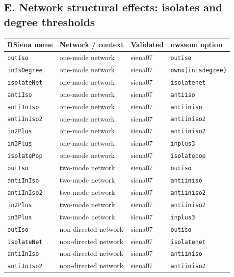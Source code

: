 \subsection*{E. Network structural effects: isolates and degree thresholds}
\footnotesize
\begin{longtable}{@{}p{2.6cm}p{3.2cm}p{2.9cm}p{5.4cm}@{}}
\toprule
RSiena name & Network / context & Validated & nwsaom option\\
\midrule
\endhead
\texttt{outIso} & one-mode network & siena07 & \texttt{outiso}\\
\texttt{inIsDegree} & one-mode network & siena07 & \texttt{ownx(inisdegree)}\\
\texttt{isolateNet} & one-mode network & siena07 & \texttt{isolatenet}\\
\texttt{antiIso} & one-mode network & siena07 & \texttt{antiiso}\\
\texttt{antiInIso} & one-mode network & siena07 & \texttt{antiiniso}\\
\texttt{antiInIso2} & one-mode network & siena07 & \texttt{antiiniso2}\\
\texttt{in2Plus} & one-mode network & siena07 & \texttt{antiiniso2}\\
\texttt{in3Plus} & one-mode network & siena07 & \texttt{inplus3}\\
\texttt{isolatePop} & one-mode network & siena07 & \texttt{isolatepop}\\
\texttt{outIso} & two-mode network & siena07 & \texttt{outiso}\\
\texttt{antiInIso} & two-mode network & siena07 & \texttt{antiiniso}\\
\texttt{antiInIso2} & two-mode network & siena07 & \texttt{antiiniso2}\\
\texttt{in2Plus} & two-mode network & siena07 & \texttt{antiiniso2}\\
\texttt{in3Plus} & two-mode network & siena07 & \texttt{inplus3}\\
\texttt{outIso} & non-directed network & siena07 & \texttt{outiso}\\
\texttt{isolateNet} & non-directed network & siena07 & \texttt{isolatenet}\\
\texttt{antiInIso} & non-directed network & siena07 & \texttt{antiiniso}\\
\texttt{antiInIso2} & non-directed network & siena07 & \texttt{antiiniso2}\\
\bottomrule
\end{longtable}
\normalsize


